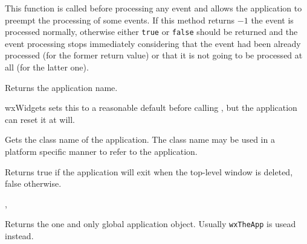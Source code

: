This function is called before processing any event and allows the application
to preempt the processing of some events. If this method returns $-1$ the event
is processed normally, otherwise either {\tt true} or {\tt false} should be
returned and the event processing stops immediately considering that the event
had been already processed (for the former return value) or that it is not
going to be processed at all (for the latter one).


\label{wxappgetappname}


Returns the application name.


wxWidgets sets this to a reasonable default before
calling , but the application can reset it at will.


\label{wxappgetclassname}


Gets the class name of the application. The class name may be used in a platform specific
manner to refer to the application.




\label{wxappgetexitonframedelete}


Returns true if the application will exit when the top-level window is deleted, false
otherwise.


,\\


\label{wxappgetinstance}


Returns the one and only global application object.
Usually \texttt{wxTheApp} is usead instead.




\label{wxappgettopwindow}


